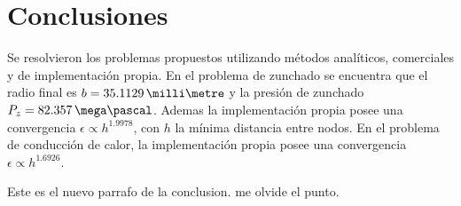 \section{Conclusiones}
Se resolvieron los problemas propuestos utilizando m\'etodos anal\'iticos, comerciales y de implementaci\'on propia. En el problema de zunchado se encuentra que el radio final es $ b=35.1129\,\milli\metre $ y la presi\'on de zunchado $P_z=82.357\,\mega\pascal$. Ademas la implementaci\'on propia posee una convergencia $\epsilon\propto h^{1.9978}$, con $h$ la m\'inima distancia entre nodos. En el problema de conducci\'on de calor, la implementaci\'on propia posee una convergencia $\epsilon\propto h^{1.6926}$.

Este es el nuevo parrafo de la conclusion. me olvide el punto.